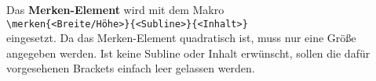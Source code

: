 \documentclass[rgb]{beamer}
\begin{document}
%
%
%
%
%
% 
%
%
%
%
%
%


\begin{frame}[t]
	\subsectionpage
	Das \textbf{Merken-Element} wird mit dem Makro\\
	\hskip 1cm \texttt{\textbackslash merken\{<Breite/Höhe>\}\{<Subline>\}\{<Inhalt>\}}\\
	eingesetzt. Da das Merken-Element quadratisch ist, muss nur eine Größe angegeben werden. Ist keine Subline oder Inhalt erwünscht, sollen die dafür vorgesehenen Brackets einfach leer gelassen werden.\\[\baselineskip]
\end{frame}
\end{document}
